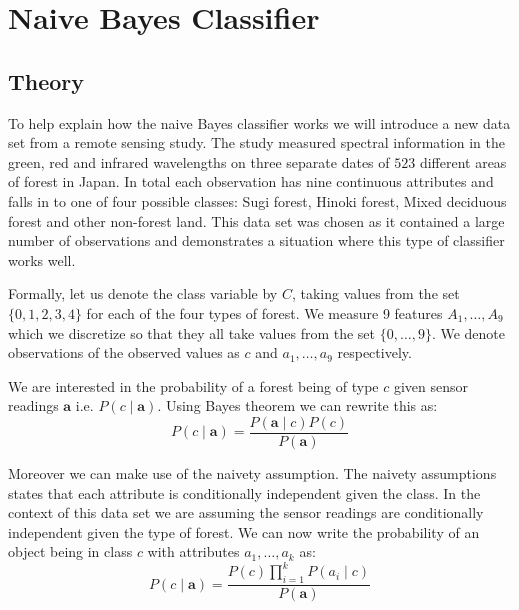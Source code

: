 \chapter{Naive Bayes Classifier}

\section{Theory}

To help explain how the naive Bayes classifier works we will introduce a new data set from a remote sensing study.
The study measured spectral information in the green, red and infrared wavelengths on three separate dates of $523$ different areas of forest in Japan.
In total each observation has nine continuous attributes and falls in to one of four possible classes: Sugi forest, Hinoki forest, Mixed deciduous forest and other non-forest land.
This data set was chosen as it contained a large number of observations and demonstrates a situation where this type of classifier works well.

Formally, let us denote the class variable by $C$, taking values from the set $\{0,1,2,3,4\}$ for each of the four types of forest.
We measure 9 features $A_1,\dots,A_9$ which we discretize so that they all take values from the set $\{0,\dots,9\}$.
We denote observations of the observed values as $c$ and $a_1,\dots,a_9$ respectively.

We are interested in the probability of a forest being of type $c$ given sensor readings $\mathbf{a}$ i.e. $P(c \mid \mathbf{a})$.
Using Bayes theorem we can rewrite this as:
\begin{equation} \label{bayes}
	P(c \mid \mathbf{a}) = \frac{P(\mathbf{a} \mid c)P(c)}{P(\mathbf{a})}
\end{equation}

Moreover we can make use of the naivety assumption.
The naivety assumptions states that each attribute is conditionally independent given the class.
In the context of this data set we are assuming the sensor readings are conditionally independent given the type of forest.
We can now write the probability of an object being in class $c$ with attributes $a_1,\dots,a_k$ as:
\begin{equation} \label{naivety}
	P(c \mid \mathbf{a}) = \frac{P(c)\prod_{i=1}^{k}P(a_i \mid c)}{P(\mathbf{a})}
\end{equation}

